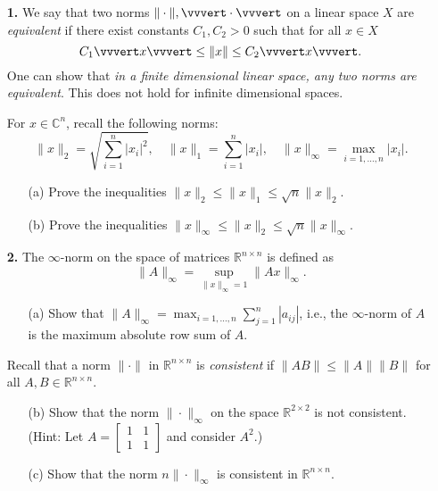 \documentclass[10pt]{report}
\begin{document}
\begin{enumerate}


\item[\textbf{1.}]
We say that two norms $\| \cdot \|, \vvvert \cdot \vvvert$ on a linear space $X$ are \textit{equivalent} if there exist constants $C_1, C_2 > 0$ such that for all $x \in X$
\[C_1 \vvvert x \vvvert \leq \|x\| \leq  C_2\vvvert x\vvvert.\]
One can show that \textit{in a finite dimensional linear space, any two norms are equivalent}. This does not hold for infinite dimensional spaces.

For $x \in \mathbb{C}^{n}$, recall the following norms: 
\[
\|x\|_2 =\sqrt{\sum_{i=1}^n |x_i|^2},\quad
\|x\|_1 = \sum_{i=1}^n |x_i|,\quad
\|x\|_{\infty} = \max_{i=1, \ldots,n}|x_i|.
\]

\begin{enumerate}
  \item[(a)]Prove the inequalities  $\|x\|_2 \leq \|x\|_1 \leq \sqrt{n}\|x\|_2$.
  \item[(b)]Prove the inequalities  $ \|x\|_\infty \leq \|x\|_2 \leq  \sqrt{n}\|x\|_{\infty}$.
\end{enumerate}

\vspace{0.7cm}

\item[\textbf{2.}] The $\infty$-norm on the space of matrices $\mathbb{R}^{n \times n}$ is defined as
\[\|A\|_{\infty}= \sup_{\|x\|_{\infty}=1} \|Ax\|_{\infty}.\]
\begin{enumerate} 
\item[(a)] Show that $\|A\|_{\infty}= \displaystyle{\max_{i=1, \ldots, n}}\sum_{j=1}^n |a_{ij}|$, i.e., the $\infty$-norm of $A$ is the maximum absolute row sum of $A$.
\end{enumerate}
Recall that a norm $\|\cdot\|$ in $\mathbb{R}^{n \times n}$ is \textit{consistent} if $\|AB\| \leq \|A\| \|B\|$ for all $A, B \in \mathbb{R}^{n \times n}$. 
\begin{enumerate} 
\item[(b)]Show that the norm $\|\cdot\|_\infty$ on the  space $\mathbb{R}^{2 \times 2}$ is not consistent.
(Hint: Let $A= \left[\begin{smallmatrix} 1&1\\1&1 \end{smallmatrix}\right]$ and consider $A^2$.)
\item[(c)] Show that the norm $n\|\cdot\|_{\infty}$ is consistent in $\mathbb{R}^{n \times n}$.
\end{enumerate}



\end{enumerate}
\end{document}
